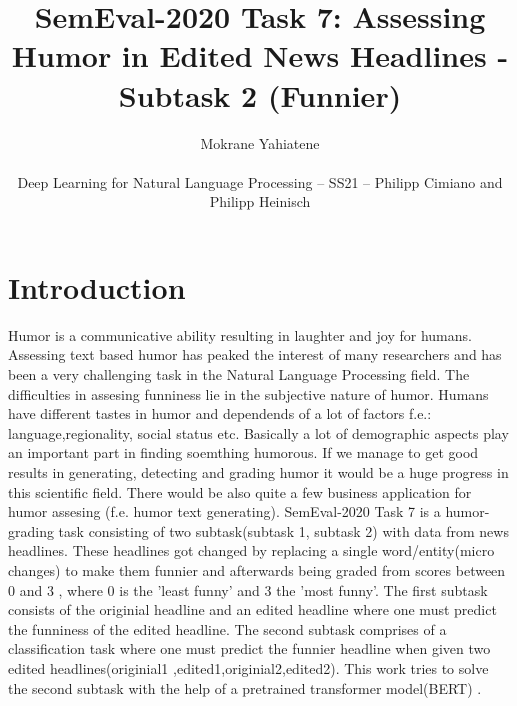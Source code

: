\documentclass[11pt,a4paper,onecolumn,oneside,notitlepage]{article}
\author{Mokrane Yahiatene\\
	\begin{small}
		Deep Learning for Natural Language Processing -- SS21 -- Philipp Cimiano and Philipp Heinisch
	\end{small}
}
\title{SemEval-2020 Task 7: Assessing Humor in Edited
	News Headlines - Subtask 2 (Funnier)}
\begin{document}
	\maketitle
	
	\section{Introduction}
		Humor is a communicative ability resulting in laughter and joy for humans. Assessing text based humor has peaked the interest of many researchers and has been a very challenging task in the Natural Language Processing field.
		The difficulties in assesing funniness lie in the subjective nature of humor. Humans have different tastes in humor and dependends of a lot of factors  f.e.: language,regionality, social status etc.
		Basically a lot of demographic aspects play an important part in finding soemthing humorous.
		If we manage to get good results in generating, detecting and grading humor it would be a huge progress in this scientific field. There would be also quite a few business application for humor assesing (f.e. humor text generating).
		SemEval-2020 Task 7 is a humor-grading task consisting of two subtask(subtask 1, subtask 2) with data from news headlines. These headlines got changed by replacing a single word/entity(micro changes) to make them funnier and afterwards being graded from scores between 0 and 3 , where 0 is the 'least funny' and 3 the 'most funny'.
		The first subtask consists of the originial headline and an edited headline where one must predict the funniness of the edited headline.
		The second subtask comprises of a classification task where one must predict the funnier headline when given two edited headlines(originial1 ,edited1,originial2,edited2).
		This work tries to solve the second subtask with the help of a pretrained transformer model(BERT) .
		
		
\end{document}

